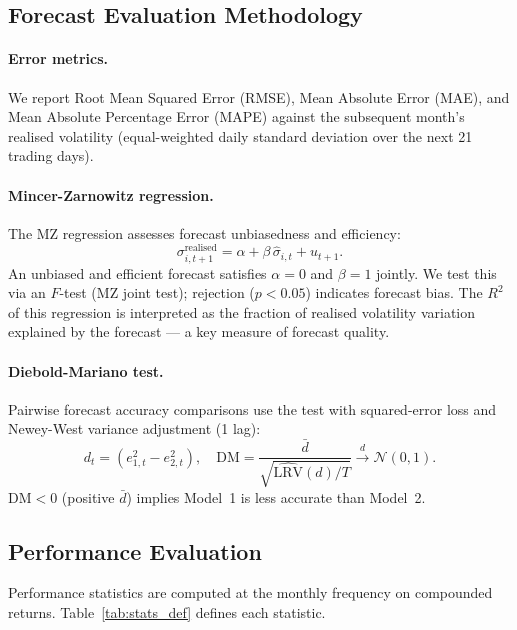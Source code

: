 \documentclass[12pt, a4paper]{article}
\newcommand{\shat}{\hat{\sigma}}
\begin{document}
\subsection{Forecast Evaluation Methodology}

\paragraph{Error metrics.} We report Root Mean Squared Error (RMSE), Mean Absolute Error
(MAE), and Mean Absolute Percentage Error (MAPE) against the subsequent month's realised
volatility (equal-weighted daily standard deviation over the next 21 trading days).

\paragraph{Mincer-Zarnowitz regression.} The MZ regression \citep{Mincer1969} assesses
forecast unbiasedness and efficiency:
\begin{equation}
  \sigma_{i,t+1}^{\mathrm{realised}} = \alpha + \beta\,\shat_{i,t} + u_{t+1}.
  \label{eq:mz}
\end{equation}
An unbiased and efficient forecast satisfies $\alpha = 0$ and $\beta = 1$ jointly. We
test this via an $F$-test (MZ joint test); rejection ($p < 0.05$) indicates forecast bias.
The $R^2$ of this regression is interpreted as the fraction of realised volatility
variation explained by the forecast --- a key measure of forecast quality.

\paragraph{Diebold-Mariano test.} Pairwise forecast accuracy comparisons use the
\citet{DM1995} test with squared-error loss and Newey-West variance adjustment (1 lag):
\begin{equation}
  d_t = (e_{1,t}^2 - e_{2,t}^2), \quad
  \mathrm{DM} = \frac{\bar{d}}{\sqrt{\widehat{\mathrm{LRV}}(d)/T}} \xrightarrow{d} \mathcal{N}(0,1).
\end{equation}
$\mathrm{DM} < 0$ (positive $\bar{d}$) implies Model~1 is less accurate than Model~2.

\subsection{Performance Evaluation}

Performance statistics are computed at the monthly frequency on compounded returns.
Table~\ref{tab:stats_def} defines each statistic.
\end{document}
